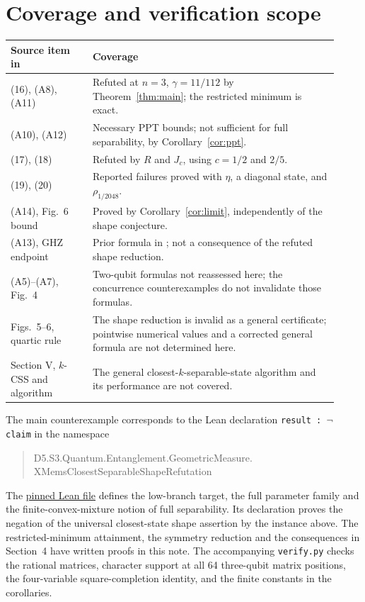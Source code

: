 \documentclass[11pt]{article}
\begin{document}
\section{Coverage and verification scope}
\begin{center}
\small
\begin{tabular}{@{}p{0.23\linewidth}p{0.69\linewidth}@{}}
\toprule
Source item in \cite{CAW} & Coverage\\
\midrule
(16), (A8), (A11) & Refuted at $n=3$, $\gamma=11/112$ by Theorem~\ref{thm:main}; the restricted minimum is exact.\\
(A10), (A12) & Necessary PPT bounds; not sufficient for full separability, by Corollary~\ref{cor:ppt}.\\
(17), (18) & Refuted by $R$ and $J_c$, using $c=1/2$ and $2/5$.\\
(19), (20) & Reported failures proved with $\eta$, a diagonal state, and $\rho_{1/2048}$.\\
(A14), Fig.~6 bound & Proved by Corollary~\ref{cor:limit}, independently of the shape conjecture.\\
(A13), GHZ endpoint & Prior formula in \cite[Eq.~(9)]{Pandya}; not a consequence of the refuted shape reduction.\\
(A5)--(A7), Fig.~4 & Two-qubit formulas not reassessed here; the concurrence counterexamples do not invalidate those formulas.\\
Figs.~5--6, quartic rule & The shape reduction is invalid as a general certificate; pointwise numerical values and a corrected general formula are not determined here.\\
Section V, $k$-CSS and algorithm & The general closest-$k$-separable-state algorithm and its performance are not covered.\\
\bottomrule
\end{tabular}
\end{center}
The main counterexample corresponds to the Lean declaration
\texttt{result : $\neg$ claim} in the namespace
\begin{quote}\small\ttfamily
D5.S3.Quantum.Entanglement.GeometricMeasure.\\
XMemsClosestSeparableShapeRefutation
\end{quote}
The \href{https://github.com/the-omega-institute/trureturing/blob/83b70a1d0d6a58bb32521c741805d845d401c5f8/D5/S3/Quantum/Entanglement/GeometricMeasure/XMemsClosestSeparableShapeRefutation.lean}{pinned Lean file}
defines the low-branch target, the full parameter family and the
finite-convex-mixture notion of full separability. Its declaration proves the
negation of the universal closest-state shape assertion by the instance above.
The restricted-minimum attainment, the symmetry reduction and the consequences
in Section~4 have written proofs in this note. The accompanying
\texttt{verify.py} checks the rational matrices, character support at all
64 three-qubit matrix positions, the four-variable square-completion identity,
and the finite constants in the corollaries.
\end{document}
